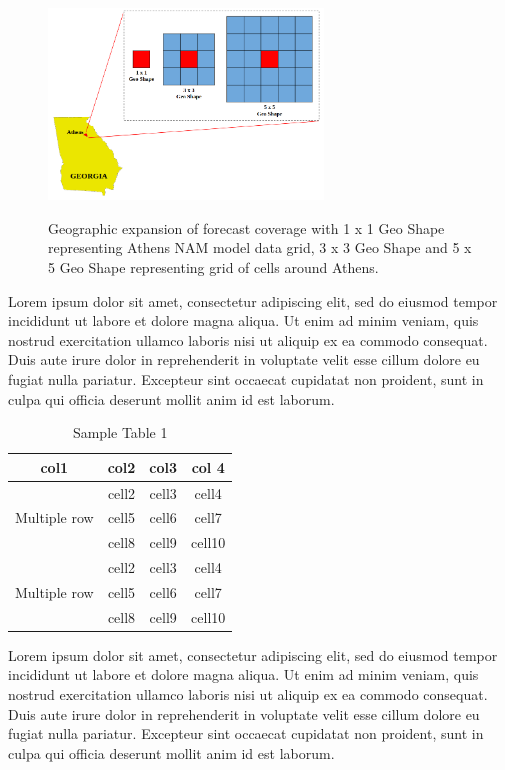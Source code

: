 \begin{figure}[htbp]
    \begin{center}
    	\includegraphics[width=0.65\textwidth]{chapter3/fig_geoshapes.png}
    	\label{fig:fig_geoshapes}
    	\caption[Geographic expansion of forecast coverage around Athens NAM model data grid]{Geographic expansion of forecast coverage with 1 x 1 Geo Shape representing Athens NAM model data grid, 3 x 3 Geo Shape and 5 x 5 Geo Shape representing grid of cells around Athens.}
    \end{center}
\end{figure}

Lorem ipsum dolor sit amet, consectetur adipiscing elit, sed do eiusmod tempor incididunt ut labore et dolore magna aliqua. Ut enim ad minim veniam, quis nostrud exercitation ullamco laboris nisi ut aliquip ex ea commodo consequat. Duis aute irure dolor in reprehenderit in voluptate velit esse cillum dolore eu fugiat nulla pariatur. Excepteur sint occaecat cupidatat non proident, sunt in culpa qui officia deserunt mollit anim id est laborum.

\begin{table}[h]
\begin{center}
    \caption{Sample Table 1}
    \begin{tabular}{ c c c c }
    	\toprule
    	col1 & col2 & col3 & col 4 \\
    	\midrule
    	\multirow{3}{4em}{Multiple row} & cell2 & cell3 & cell4\\ &
    	cell5 & cell6 & cell7 \\ &
    	cell8 & cell9 & cell10 \\
    	\midrule
    	\multirow{3}{4em}{Multiple row} & cell2 & cell3 & cell4 \\ &
    	cell5 & cell6 & cell7 \\ &
    	cell8 & cell9 & cell10 \\
    	\bottomrule
    \end{tabular}
\end{center}
\end{table}

Lorem ipsum dolor sit amet, consectetur adipiscing elit, sed do eiusmod tempor incididunt ut labore et dolore magna aliqua. Ut enim ad minim veniam, quis nostrud exercitation ullamco laboris nisi ut aliquip ex ea commodo consequat. Duis aute irure dolor in reprehenderit in voluptate velit esse cillum dolore eu fugiat nulla pariatur. Excepteur sint occaecat cupidatat non proident, sunt in culpa qui officia deserunt mollit anim id est laborum.

\newpage